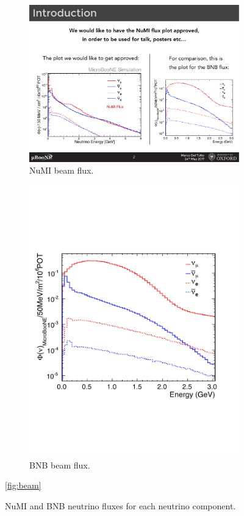 \begin{figure}[htbp]
\centering
  \begin{subfigure}{0.45\textwidth}
    \includegraphics[width=\linewidth]{figures/numi.pdf}
    \caption{NuMI beam flux.} 
  \end{subfigure}
    \begin{subfigure}{0.45\textwidth}
    \includegraphics[width=\linewidth]{figures/bnb.pdf}
    \caption{BNB beam flux.} 
  \end{subfigure}
  \caption{NuMI and BNB neutrino fluxes for each neutrino component.}\ref{fig:beam}
\end{figure}

